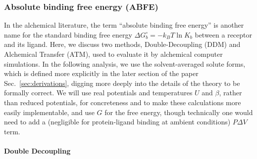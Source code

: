 \documentclass[9pt,bestpractices]{livecoms}
\begin{document}
\subsubsection{Absolute binding free energy (ABFE)}
\label{sec:theory-abfe}

In the alchemical literature, the term ``absolute binding free energy'' is another name for the standard binding free energy $\Delta G^\circ_b = - k_B T \ln K_b$ between a receptor and its ligand.  Here, we discuss two methods, Double-Decoupling (DDM) and Alchemical Transfer (ATM), used to evaluate it by alchemical computer simulations.  In the following analysis, we use the solvent-averaged solute forms, which is defined more explicitly in the later section of the paper Sec.~\ref{sec:derivations}, digging more deeply into the details of the theory to be formally correct.  We will use real potentials and temperatures $U$ and $\beta$, rather than reduced potentials, for concreteness and to make these calculations more easily implementable, and use $G$ for the free energy, though technically one would need to add a (negligible for protein-ligand binding at ambient conditions) $P\Delta V$ term. 

\paragraph{Double Decoupling}
\end{document}
